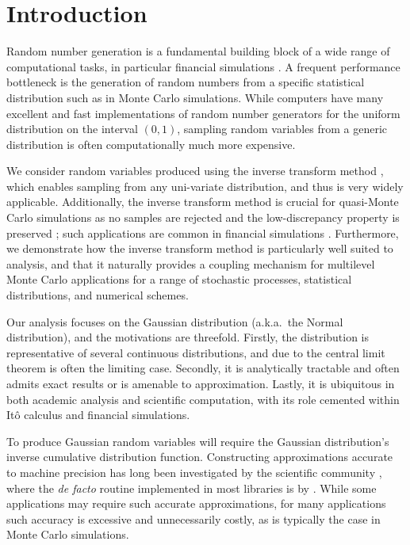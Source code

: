 \documentclass[manuscript,review]{acmart}
\begin{document}
\maketitle


\section{Introduction}
\label{sec:introduction}

Random number generation is a fundamental building block of a wide range of computational tasks, in particular financial simulations \citep{glasserman2013monte,asmussen2007stochastic,joy1996quasi,xu2015high}. A frequent performance bottleneck is the generation of random numbers from a specific statistical distribution such as in Monte Carlo simulations.  While computers have many excellent and fast implementations of random number generators for the uniform distribution on the interval $(0,1)$, sampling random variables from a generic distribution is often computationally much more expensive.

We consider random variables produced using the inverse transform method \citep{glasserman2013monte}, which enables sampling from any uni-variate distribution, and thus is very widely applicable. Additionally, the inverse transform method is crucial for quasi-Monte Carlo simulations \citep{giles2009multilevel_qmc,lecuyer2016randomized} as no samples are rejected and the low-discrepancy property is preserved \citep{tezuka1995uniform}; such applications are common in financial simulations \citep{joy1996quasi,xu2015high}. Furthermore, we demonstrate how the inverse transform method is particularly well suited to analysis, and that it naturally provides a coupling mechanism for multilevel Monte Carlo applications for a range of stochastic processes, statistical distributions, and numerical schemes. 

Our analysis focuses on the Gaussian distribution (a.k.a.\ the Normal distribution), and the motivations are threefold. Firstly, the distribution is representative of several continuous distributions, and due to the central limit theorem is often the limiting case. Secondly, it is analytically tractable and often admits exact results or is amenable to approximation. Lastly, it is ubiquitous in both academic analysis and scientific computation, with its role cemented within It\^{o} calculus and financial simulations. 

To produce Gaussian random variables will require the Gaussian distribution's inverse cumulative distribution function. Constructing approximations accurate to machine precision has long been investigated by the scientific community \citep{hastings1955approximations,evans1974algorithm70,beasley1985percentage,wichura1988algorithm,marsaglia1994rapid,giles2011approximating}, where the \textit{de facto} routine implemented in most libraries is by \citet{wichura1988algorithm}. While some applications may require such accurate approximations, for many applications such accuracy is excessive and unnecessarily costly, as is typically the case in Monte Carlo simulations. 
\end{document}
